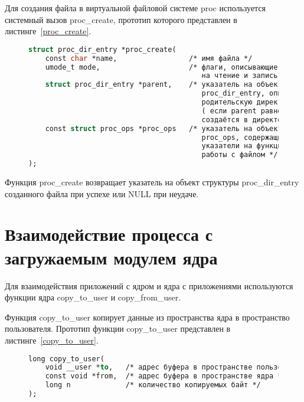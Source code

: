 Для создания файла в виртуальной файловой системе proc используется системный вызов proc\_create, прототип которого представлен в листинге~\ref{proc_create}.
\begin{figure}[H]
	\begin{lstlisting}[label=proc_create,caption=Прототип функции proc\_create (версия ядра Linux~--- 6.5.13),language=Caml]
struct proc_dir_entry *proc_create(
	const char *name,                 /* имя файла */
	umode_t mode,                     /* флаги, описывающие разрешения
	                                     на чтение и запись */
	struct proc_dir_entry *parent,    /* указатель на объект структуры
	                                     proc_dir_entry, описывающий
	                                     родительскую директорию
	                                     ( если parent равно NULL, то файл
	                                     создаётся в директории /proc) */
	const struct proc_ops *proc_ops   /* указатель на объект структуры
	                                     proc_ops, содержащий
	                                     указатели на функции
	                                     работы с файлом */
);
	\end{lstlisting}
\end{figure}

Функция proc\_create возвращает указатель на объект структуры proc\_dir\_entry созданного файла при успехе или NULL при неудаче.

\section{Взаимодействие процесса с загружаемым модулем ядра}

Для взаимодействия приложений с ядром и ядра с приложениями используются функции ядра copy\_to\_user и copy\_from\_user.

Функция copy\_to\_user копирует данные из пространства ядра в пространство пользователя.
Прототип функции copy\_to\_user представлен в листинге~\ref{copy_to_user}.
\begin{figure}[H]
	\begin{lstlisting}[label=copy_to_user,caption=Прототип функции copy\_to\_user (версия ядра Linux~--- 6.5.13),language=Caml]
long copy_to_user(
	void __user *to,   /* адрес буфера в пространстве пользователя */
	const void *from,  /* адрес буфера в пространстве ядра */
	long n             /* количество копируемых байт */
);
	\end{lstlisting}
\end{figure}

